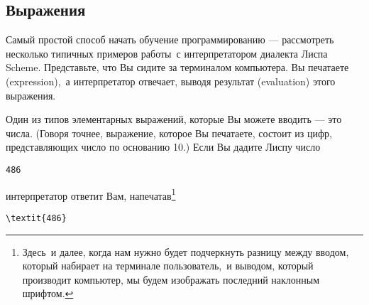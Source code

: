 \subsection{Выражения}
\label{EXPRESSIONS}


Самый простой способ начать обучение
программированию --- рассмотреть несколько типичных
примеров работы~с интерпретатором диалекта Лиспа Scheme.
Представьте, что Вы сидите за терминалом компьютера.  Вы печатаете
 (expression),~а интерпретатор отвечает, выводя
результат  (evaluation) этого выражения.

Один из типов элементарных выражений, которые Вы можете вводить ---
это числа.  (Говоря точнее, выражение, которое Вы печатаете, состоит
из цифр, представляющих число по основанию 10.)  Если Вы дадите Лиспу
число

\begin{Verbatim}[fontsize=\small]
486
\end{Verbatim}
интерпретатор ответит Вам, напечатав\footnote{Здесь~и далее, когда нам нужно
будет
подчеркнуть разницу между вводом, который набирает на терминале пользователь,~и выводом,
который производит компьютер, мы будем изображать последний наклонным
шрифтом.
}

\begin{Verbatim}[fontsize=\small]
\textit{486}
\end{Verbatim}

